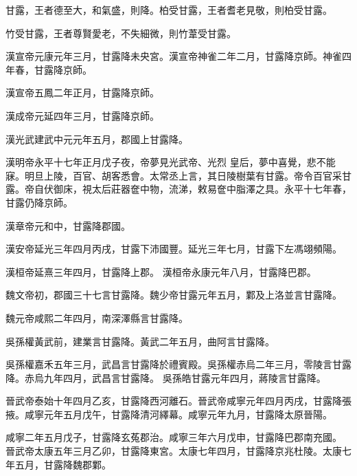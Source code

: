 \begin{pinyinscope}
 甘露，王者德至大，和氣盛，則降。柏受甘露，王者耆老見敬，則柏受甘露。



 竹受甘露，王者尊賢愛老，不失細微，則竹葦受甘露。



 漢宣帝元康元年三月，甘露降未央宮。漢宣帝神雀二年二月，甘露降京師。神雀四年春，甘露降京師。



 漢宣帝五鳳二年正月，甘露降京師。



 漢成帝元延四年三月，甘露降京師。



 漢光武建武中元元年五月，郡國上甘露降。



 漢明帝永平十七年正月戊子夜，帝夢見光武帝、光烈
 皇后，夢中喜覺，悲不能寐。明旦上陵，百官、胡客悉會。太常丞上言，其日陵樹葉有甘露。帝令百官采甘露。帝自伏御床，視太后莊器奩中物，流涕，敕易奩中脂澤之具。永平十七年春，甘露仍降京師。



 漢章帝元和中，甘露降郡國。



 漢安帝延光三年四月丙戌，甘露下沛國豐。延光三年七月，甘露下左馮翊頻陽。



 漢桓帝延熹三年四月，甘露降上郡。
 漢桓帝永康元年八月，甘露降巴郡。



 魏文帝初，郡國三十七言甘露降。魏少帝甘露元年五月，鄴及上洛並言甘露降。



 魏元帝咸熙二年四月，南深澤縣言甘露降。



 吳孫權黃武前，建業言甘露降。黃武二年五月，曲阿言甘露降。



 吳孫權嘉禾五年三月，武昌言甘露降於禮賓殿。吳孫權赤烏二年三月，零陵言甘露降。赤烏九年四月，武昌言甘露降。
 吳孫皓甘露元年四月，蔣陵言甘露降。



 晉武帝泰始十年四月乙亥，甘露降西河離石。晉武帝咸寧元年四月丙戌，甘露降張掖。咸寧元年五月戊午，甘露降清河繹幕。咸寧元年九月，甘露降太原晉陽。



 咸寧二年五月戊子，甘露降玄菟郡治。咸寧三年六月戊申，甘露降巴郡南充國。
 晉武帝太康五年三月乙卯，甘露降東宮。太康七年四月，甘露降京兆杜陵。太康七年五月，甘露降魏郡鄴。




\end{pinyinscope}

